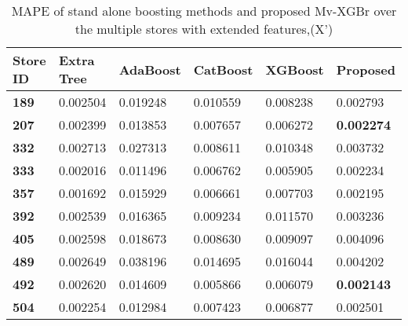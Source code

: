 \begin{table*}[]
\centering
\caption{MAPE of stand alone boosting methods and proposed Mv-XGBr over the multiple stores with extended features,(X')}
\setlength{\tabcolsep}{3pt}
 {\renewcommand{\arraystretch}{1}%
\label{tab:my-table}
\begin{tabular}{llllll}
\hline \textbf{Store ID} & \textbf{Extra Tree} & \textbf{AdaBoost} & \textbf{CatBoost} & \textbf{XGBoost} & \textbf{Proposed}    \\ \hline
\textbf{189}   & 0.002504            & 0.019248                      & 0.010559                      & 0.008238                     & 0.002793
        \\
\textbf{207}   & 0.002399            & 0.013853                      & 0.007657                      & 0.006272                     & \textbf{0.002274}        \\
\textbf{332}   & 0.002713            & 0.027313                      & 0.008611                      & 0.010348                     & 0.003732          \\
\textbf{333}   & 0.002016            & 0.011496                      & 0.006762                      & 0.005905                     & 0.002234          \\
\textbf{357}   & 0.001692            & 0.015929                      & 0.006661                      & 0.007703                     & 0.002195          \\
\textbf{392}   & 0.002539            & 0.016365                      & 0.009234                      & 0.011570                     & 0.003236          \\
\textbf{405}   & 0.002598            & 0.018673                      & 0.008630                      & 0.009097                     & 0.004096          \\
\textbf{489}   & 0.002649            & 0.038196                      & 0.014695                      & 0.016044                     & 0.004202          \\
\textbf{492}   & 0.002620            & 0.014609                      & 0.005866                      & 0.006079                     & \textbf{0.002143}         \\
\textbf{504}   & 0.002254            & 0.012984                      & 0.007423                      & 0.006877                     & 0.002501       \\   \hline
\end{tabular}
}
\end{table*}


